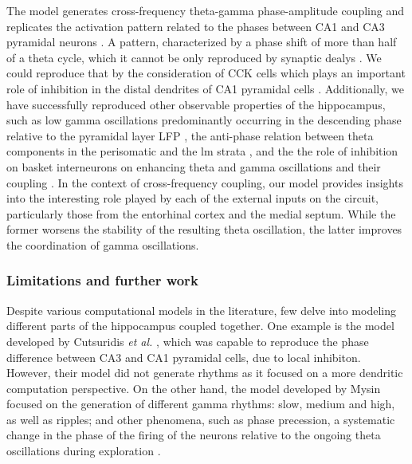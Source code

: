 \documentclass[../main.tex]{subfiles}
\begin{document}
The model generates cross-frequency theta-gamma phase-amplitude coupling and replicates the activation pattern related to the phases between CA1 and CA3 pyramidal neurons \cite{mizuseki_theta_2009, cutsuridis_computational_2015}.
A pattern, characterized by a phase shift of more than half of a theta cycle, which it cannot be only reproduced by synaptic dealys \citep{cutsuridis_computational_2015}.
We could reproduce that by the consideration of CCK cells which plays an important role of inhibition in the distal dendrites of CA1 pyramidal cells \citep{bilash_lateral_2023}.
Additionally, we have successfully reproduced other observable properties of the hippocampus, such as low gamma oscillations predominantly occurring in the descending phase relative to the pyramidal layer LFP \citep{schomburg_theta_2014,lopez-madrona_different_2020}, the anti-phase relation between theta components in the perisomatic and the lm strata \citep{schomburg_theta_2014,fernandez-ruiz_entorhinal-ca3_2017}, and the the role of inhibition on basket interneurons on enhancing theta and gamma oscillations and their coupling \citep{wulff_hippocampal_2009}.
In the context of cross-frequency coupling, our model provides insights into the interesting role played by each of the external inputs on the circuit, particularly those from the entorhinal cortex and the medial septum.
While the former worsens the stability of the resulting theta oscillation, the latter improves the coordination of gamma oscillations.

\subsubsection{Limitations and further work}
Despite various computational models in the literature, few delve into modeling different parts of the hippocampus coupled together.
One example is the model developed by Cutsuridis \textit{et al.} \citep{cutsuridis_computational_2015}, which was capable to reproduce the phase difference between CA3 and CA1 pyramidal cells, due to local inhibiton.
However, their model did not generate rhythms as it focused on a more dendritic computation perspective.
On the other hand, the model developed by Mysin \citep{mysin_model_2021} focused on the generation of different gamma rhythms: slow, medium and high, as well as ripples; and other phenomena, such as phase precession, a systematic change in the phase of the firing of the neurons relative to the ongoing theta oscillations during exploration \citep{hyafil_neural_2015}.
\end{document}
